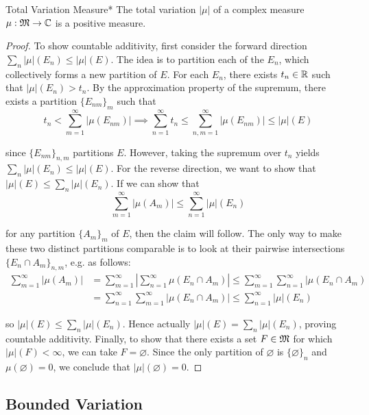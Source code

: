 \begin{theorem}{Total Variation Measure}*
    The total variation $|\mu|$ of a complex measure $\mu : \mathfrak{M} \to \mathbb{C}$ is a positive measure. 
\end{theorem}

\begin{proof}
    To show countable additivity, first consider the forward direction $\sum_n |\mu|(E_n) \leq |\mu|(E)$. The idea is to partition each of the $E_n$, which collectively forms a new partition of $E$. For each $E_n$, there exists $t_n \in \mathbb{R}$ such that $|\mu|(E_n) > t_n$. By the approximation property of the supremum, there exists a partition $\{E_{nm}\}_m$ such that 
    $$
        t_n < \sum_{m=1}^\infty |\mu(E_{nm})|
        \implies
        \sum_{n=1}^\infty t_n \leq \sum_{n,m=1}^\infty |\mu(E_{nm})|
        \leq |\mu|(E) 
    $$

    since $\{E_{nm}\}_{n,m}$ partitions $E$. However, taking the supremum over $t_n$ yields $\sum_n |\mu|(E_n) \leq |\mu|(E)$. For the reverse direction, we want to show that $|\mu|(E) \leq \sum_n |\mu|(E_n)$. If we can show that
    $$
        \sum_{m=1}^\infty |\mu(A_m)| \leq \sum_{n=1}^\infty |\mu|(E_n)
    $$

    for any partition $\{A_m\}_m$ of $E$, then the claim will follow. The only way to make these two distinct partitions comparable is to look at their pairwise intersections $\{E_n \cap A_m\}_{n,m}$, e.g. as follows: 
    \begin{align*}
        \sum_{m=1}^\infty |\mu(A_m)|
        &= \sum_{m=1}^\infty \left| \sum_{n=1}^\infty \mu(E_n \cap A_m) \right| 
        \leq \sum_{m=1}^\infty \sum_{n=1}^\infty |\mu(E_n \cap A_m) \\
        &= \sum_{n=1}^\infty \sum_{m=1}^\infty |\mu(E_n \cap A_m)|
        \leq \sum_{n=1}^\infty |\mu|(E_n)
    \end{align*}

    so $|\mu|(E) \leq \sum_n |\mu|(E_n)$. Hence actually $|\mu|(E) = \sum_n |\mu|(E_n)$, proving countable additivity. Finally, to show that there exists a set $F \in \mathfrak{M}$ for which $|\mu|(F) < \infty$, we can take $F = \varnothing$. Since the only partition of $\varnothing$ is $\{\varnothing\}_n$ and $\mu(\varnothing) = 0$, we conclude that $|\mu|(\varnothing) = 0$. 
\end{proof}

\subsection{Bounded Variation}


